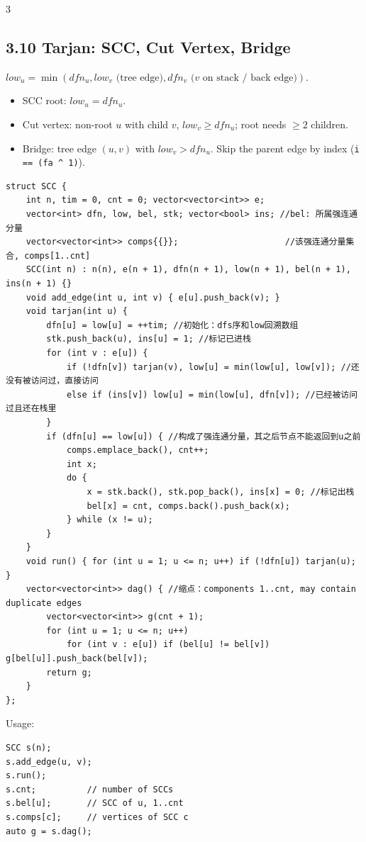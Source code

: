 \documentclass[8pt]{extarticle}
\begin{document}
\begin{multicols*}{3}
\subsection*{3.10 Tarjan: SCC, Cut Vertex, Bridge}

$low_u = \min(dfn_u, low_v \text{ (tree edge)}, dfn_v \text{ (}v\text{ on stack / back edge)})$.
\begin{itemize}
\item SCC root: $low_u = dfn_u$.
\item Cut vertex: non-root $u$ with child $v$, $low_v \ge dfn_u$; root needs $\ge 2$ children.
\item Bridge: tree edge $(u, v)$ with $low_v > dfn_u$. Skip the parent edge by index (\texttt{i == (fa \textasciicircum{} 1)}).
\end{itemize}

\begin{lstlisting}
struct SCC {
    int n, tim = 0, cnt = 0; vector<vector<int>> e;
    vector<int> dfn, low, bel, stk; vector<bool> ins; //bel: 所属强连通分量
    vector<vector<int>> comps{{}};                     //该强连通分量集合, comps[1..cnt]
    SCC(int n) : n(n), e(n + 1), dfn(n + 1), low(n + 1), bel(n + 1), ins(n + 1) {}
    void add_edge(int u, int v) { e[u].push_back(v); }
    void tarjan(int u) {
        dfn[u] = low[u] = ++tim; //初始化：dfs序和low回溯数组
        stk.push_back(u), ins[u] = 1; //标记已进栈
        for (int v : e[u]) {
            if (!dfn[v]) tarjan(v), low[u] = min(low[u], low[v]); //还没有被访问过，直接访问
            else if (ins[v]) low[u] = min(low[u], dfn[v]); //已经被访问过且还在栈里
        }
        if (dfn[u] == low[u]) { //构成了强连通分量，其之后节点不能返回到u之前
            comps.emplace_back(), cnt++;
            int x;
            do {
                x = stk.back(), stk.pop_back(), ins[x] = 0; //标记出栈
                bel[x] = cnt, comps.back().push_back(x);
            } while (x != u);
        }
    }
    void run() { for (int u = 1; u <= n; u++) if (!dfn[u]) tarjan(u); }
    vector<vector<int>> dag() { //缩点：components 1..cnt, may contain duplicate edges
        vector<vector<int>> g(cnt + 1);
        for (int u = 1; u <= n; u++)
            for (int v : e[u]) if (bel[u] != bel[v]) g[bel[u]].push_back(bel[v]);
        return g;
    }
};
\end{lstlisting}

Usage:

\begin{lstlisting}
SCC s(n);
s.add_edge(u, v);
s.run();
s.cnt;          // number of SCCs
s.bel[u];       // SCC of u, 1..cnt
s.comps[c];     // vertices of SCC c
auto g = s.dag();
\end{lstlisting}


\end{multicols*}
\end{document}
